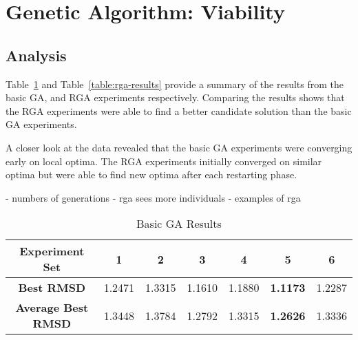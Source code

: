 \section{Genetic Algorithm: Viability}

\subsection{Analysis}

Table~\ref{table:basic-ga-results} and Table~\ref{table:rga-results} provide a summary of the results from the basic GA, and RGA experiments respectively. Comparing the results shows that the RGA experiments were able to find a better candidate solution than the basic GA experiments.

A closer look at the data revealed that the basic GA experiments were converging early on local optima. The RGA experiments initially converged on similar optima but were able to find new optima after each restarting phase.



- numbers of generations
- rga sees more individuals
- examples of rga


\begin{table}
	\centering
	\begin{tabular}{ | >{\bfseries}c | c | c | c | c | c | c | }
		\hline
		Experiment Set & 1 & 2 & 3 & 4 & 5 & 6 \\ \hline
		Best RMSD & 1.2471 & 1.3315 & 1.1610 & 1.1880 & \textbf{1.1173} & 1.2287 \\ \hline
		Average Best RMSD & 1.3448 & 1.3784 & 1.2792 & 1.3315 & \textbf{1.2626} & 1.3336 \\ \hline
	\end{tabular}
	\caption{Basic GA Results}
	\label{table:basic-ga-results}
\end{table}

